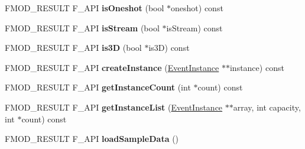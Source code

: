 \begin{DoxyCompactItemize}
\item 
\hypertarget{class_f_m_o_d_1_1_studio_1_1_event_description_abeeb0cf6e03275f312e06727f21d9418}{F\+M\+O\+D\+\_\+\+R\+E\+S\+U\+L\+T F\+\_\+\+A\+P\+I {\bfseries is\+Oneshot} (bool $\ast$oneshot) const }\label{class_f_m_o_d_1_1_studio_1_1_event_description_abeeb0cf6e03275f312e06727f21d9418}

\item 
\hypertarget{class_f_m_o_d_1_1_studio_1_1_event_description_a378c20afe76e86acce4b909b9fe5f212}{F\+M\+O\+D\+\_\+\+R\+E\+S\+U\+L\+T F\+\_\+\+A\+P\+I {\bfseries is\+Stream} (bool $\ast$is\+Stream) const }\label{class_f_m_o_d_1_1_studio_1_1_event_description_a378c20afe76e86acce4b909b9fe5f212}

\item 
\hypertarget{class_f_m_o_d_1_1_studio_1_1_event_description_aba1144b5eabd516e058b9e292948e573}{F\+M\+O\+D\+\_\+\+R\+E\+S\+U\+L\+T F\+\_\+\+A\+P\+I {\bfseries is3\+D} (bool $\ast$is3\+D) const }\label{class_f_m_o_d_1_1_studio_1_1_event_description_aba1144b5eabd516e058b9e292948e573}

\item 
\hypertarget{class_f_m_o_d_1_1_studio_1_1_event_description_aef7bcf9f0cac78493484ab7766a72b4f}{F\+M\+O\+D\+\_\+\+R\+E\+S\+U\+L\+T F\+\_\+\+A\+P\+I {\bfseries create\+Instance} (\hyperlink{class_f_m_o_d_1_1_studio_1_1_event_instance}{Event\+Instance} $\ast$$\ast$instance) const }\label{class_f_m_o_d_1_1_studio_1_1_event_description_aef7bcf9f0cac78493484ab7766a72b4f}

\item 
\hypertarget{class_f_m_o_d_1_1_studio_1_1_event_description_aae0cb88ac565314f4a2e5d7a0d0c1f4b}{F\+M\+O\+D\+\_\+\+R\+E\+S\+U\+L\+T F\+\_\+\+A\+P\+I {\bfseries get\+Instance\+Count} (int $\ast$count) const }\label{class_f_m_o_d_1_1_studio_1_1_event_description_aae0cb88ac565314f4a2e5d7a0d0c1f4b}

\item 
\hypertarget{class_f_m_o_d_1_1_studio_1_1_event_description_af9c6c1e885ad40974c77b9adcd656a42}{F\+M\+O\+D\+\_\+\+R\+E\+S\+U\+L\+T F\+\_\+\+A\+P\+I {\bfseries get\+Instance\+List} (\hyperlink{class_f_m_o_d_1_1_studio_1_1_event_instance}{Event\+Instance} $\ast$$\ast$array, int capacity, int $\ast$count) const }\label{class_f_m_o_d_1_1_studio_1_1_event_description_af9c6c1e885ad40974c77b9adcd656a42}

\item 
\hypertarget{class_f_m_o_d_1_1_studio_1_1_event_description_a930cd43fd372dd7612ece4b0dcfcc10c}{F\+M\+O\+D\+\_\+\+R\+E\+S\+U\+L\+T F\+\_\+\+A\+P\+I {\bfseries load\+Sample\+Data} ()}\label{class_f_m_o_d_1_1_studio_1_1_event_description_a930cd43fd372dd7612ece4b0dcfcc10c}


\end{DoxyCompactItemize}
